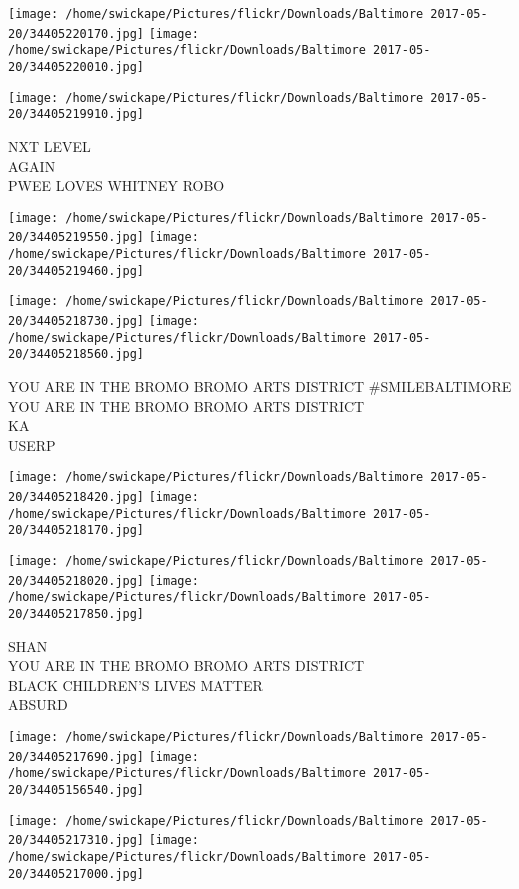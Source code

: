 \documentclass[10pt,letterpaper]{article}
\begin{document}
\texttt{[image: /home/swickape/Pictures/flickr/Downloads/Baltimore 2017-05-20/34405220170.jpg]}
\texttt{[image: /home/swickape/Pictures/flickr/Downloads/Baltimore 2017-05-20/34405220010.jpg]}

\vspace{0.25in}
\texttt{[image: /home/swickape/Pictures/flickr/Downloads/Baltimore 2017-05-20/34405219910.jpg]}

NXT LEVEL\\
AGAIN\\
PWEE LOVES WHITNEY ROBO
\pagebreak

\texttt{[image: /home/swickape/Pictures/flickr/Downloads/Baltimore 2017-05-20/34405219550.jpg]}
\texttt{[image: /home/swickape/Pictures/flickr/Downloads/Baltimore 2017-05-20/34405219460.jpg]}

\texttt{[image: /home/swickape/Pictures/flickr/Downloads/Baltimore 2017-05-20/34405218730.jpg]}
\texttt{[image: /home/swickape/Pictures/flickr/Downloads/Baltimore 2017-05-20/34405218560.jpg]}

YOU ARE IN THE BROMO BROMO ARTS DISTRICT \#SMILEBALTIMORE\\
YOU ARE IN THE BROMO BROMO ARTS DISTRICT\\
KA\\
USERP
\pagebreak

\texttt{[image: /home/swickape/Pictures/flickr/Downloads/Baltimore 2017-05-20/34405218420.jpg]}
\texttt{[image: /home/swickape/Pictures/flickr/Downloads/Baltimore 2017-05-20/34405218170.jpg]}

\texttt{[image: /home/swickape/Pictures/flickr/Downloads/Baltimore 2017-05-20/34405218020.jpg]}
\texttt{[image: /home/swickape/Pictures/flickr/Downloads/Baltimore 2017-05-20/34405217850.jpg]}

SHAN\\
YOU ARE IN THE BROMO BROMO ARTS DISTRICT\\
BLACK CHILDREN'S LIVES MATTER\\
ABSURD
\pagebreak

\texttt{[image: /home/swickape/Pictures/flickr/Downloads/Baltimore 2017-05-20/34405217690.jpg]}
\texttt{[image: /home/swickape/Pictures/flickr/Downloads/Baltimore 2017-05-20/34405156540.jpg]}

\texttt{[image: /home/swickape/Pictures/flickr/Downloads/Baltimore 2017-05-20/34405217310.jpg]}
\texttt{[image: /home/swickape/Pictures/flickr/Downloads/Baltimore 2017-05-20/34405217000.jpg]}
\end{document}
